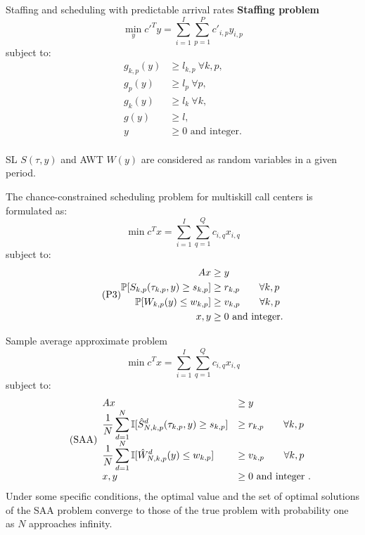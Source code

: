 \documentclass{beamer}
\begin{document}
\begin{frame}{Staffing and scheduling with predictable arrival rates}
	\textbf{Staffing problem}	
	\[
	\min_y {c'}^T y = \sum_{i=1}^I\sum_{p=1}^P c'_{i,p}y_{i,p}
	\]
	subject to:
	\begin{equation} \tag{P2}
	\begin{aligned}
	g_{k,p}({y}) &\geq l_{k,p} ~\forall k,p, \\
	g_{p}({y}) &\geq l_{p} ~\forall p, \\
	g_{k}({y}) &\geq l_{k} ~\forall k, \\
	g(y) &\geq l,\\
	{y}&\geq 0 \text{ and integer}  \text{.}\\
	\end{aligned}
	\end{equation}
\end{frame}

\begin{frame}
	
	SL $S(\tau, y)$ and AWT $W(y)$ are considered as random variables in a given period.
	
	The chance-constrained scheduling problem for multiskill call centers is formulated as:
	\[
	\min {c}^T{x} = \sum_{i=1}^I \sum_{q=1}^Q c_{i,q}x_{i,q}
	\]
	subject to:
	\begin{equation} \tag{P3}
	\begin{aligned}
	{Ax} &\geq {y} \\
	\mathbb{P}[S_{k,p}(\tau_{k,p}, {y}) \geq s_{k,p}] &\geq r_{k,p} \text{\qquad{}}  \forall k,p \\
	\mathbb{P}[W_{k,p}(y) \leq w_{k,p}] &\geq  v_{k,p} \text{\qquad{}} \forall k,p\\
	{x}, {y} &\geq 0 \text{ and integer}. \\
	\end{aligned}
	\end{equation}
\end{frame}


\begin{frame}{Sample average approximate problem}
	\[
	\min {c}^T{x} = \sum_{i=1}^I \sum_{q=1}^Q c_{i,q}x_{i,q}
	\]
	subject to:
	\begin{equation} \tag{SAA} \label{s1}
	\begin{array}{ll}
	{Ax} &\geq {y} \\
	\displaystyle \frac{1}{N} \sum_{d=1}^N\mathbb{I}[\hat{S}_{N, k,p}^d(\tau_{k,p}, {y}) \geq s_{k,p}] &\geq r_{k,p} \text{\qquad{}}\forall k,p\\
	\displaystyle \frac{1}{N}\sum_{d=1}^N\mathbb{I}[\hat{W}_{N,k,p}^d({y}) \leq w_{k,p}]&\geq v_{k,p} \text{\qquad{}}\forall k,p\\
	{x}, {y} &\geq 0 \text{ and integer}  \text{ .}\\
	\end{array}
	\end{equation}
	Under some specific conditions, the optimal value and the set of optimal solutions of the SAA problem converge to those of the true problem  with probability one as $N$ approaches infinity. 
\end{frame}
\end{document}
